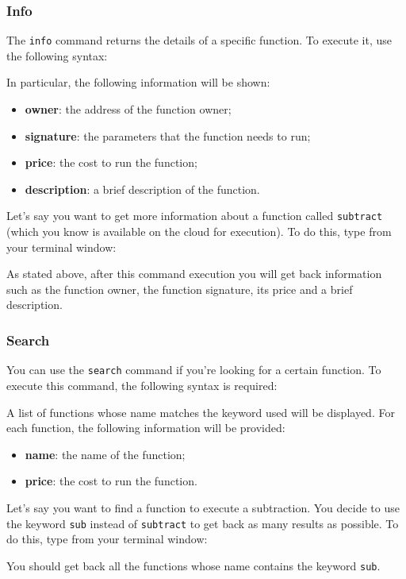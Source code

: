 \subsubsection{Info}
The \texttt{info} command returns the details of a specific function. To execute it, use the following syntax: \\
\begin{center}
\end{center}
In particular, the following information will be shown:
\begin{itemize}
	\item \textbf{owner}: the address of the function owner;
	\item \textbf{signature}: the parameters that the function needs to run;
	\item \textbf{price}: the cost to run the function;
	\item \textbf{description}: a brief description of the function.
\end{itemize}
Let's say you want to get more information about a function called \texttt{subtract} (which you know is available on the cloud for execution). To do this, type from your terminal window:
\begin{center}
\end{center}
As stated above, after this command execution you will get back information such as the function owner, the function signature, its price and a brief description.

\subsubsection{Search}
You can use the \texttt{search} command if you're looking for a certain function. To execute this command, the following syntax is required:
\begin{center}
\end{center}

A list of functions whose name matches the keyword used will be displayed. For each function, the following information will be provided:
\begin{itemize}
	\item \textbf{name}: the name of the function;
	\item \textbf{price}: the cost to run the function.
\end{itemize}
Let's say you want to find a function to execute a subtraction. You decide to use the keyword \texttt{sub} instead of \texttt{subtract} to get back as many results as possible. To do this, type from your terminal window:
\begin{center}
\end{center}
You should get back all the functions whose name contains the keyword \texttt{sub}.

